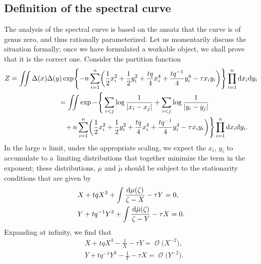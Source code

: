 \documentclass[pdftex]{sigma}
\DeclareMathOperator{\OO}{\mathcal{O}}
\numberwithin{equation}{section}
\begin{document}
\subsection{Definition of the spectral curve}
The analysis of the spectral curve is based on the ansatz that the curve is of genus zero, and thus rationally parameterized. Let us momentarily discuss the situation formally; once we have formulated a workable object, we shall prove that it is the correct one. Consider the partition function
 \begin{gather*}
 Z= \iint \Delta(x) \Delta(y) \exp\Biggl\{-n\sum_{i=1}^n \biggl(\frac{1}{2}x_i^2 + \frac{1}{2}y_i^2 + \frac{t q}{4} x_i^4 + \frac{t q^{-1}}{4} y_i^4 - \tau x_iy_i\biggr)\Biggr\} \prod_{i=1}^n {\rm d}x_i {\rm d}y_i\\
 \hphantom{Z}{}
= \iint \exp - \Bigg\{ \sum_{i < j} \log\frac{1}{|x_i - x_j|} + \sum_{i < j} \log\frac{1}{|y_i - y_j|} \\
\hphantom{Z=\iint \exp - \Bigg\{}{}
+ n\sum_{i=1}^n \biggl(\frac{1}{2}x_i^2 + \frac{1}{2}y_i^2 + \frac{t q}{4} x_i^4 + \frac{t q^{-1}}{4} y_i^4 - \tau x_iy_i\biggr)\Bigg\} \prod_{i=1}^n {\rm d}x_i {\rm d}y_i.
 \end{gather*}
In the large $n$ limit, under the appropriate scaling, we expect the $x_i$, $y_i$ to accumulate to a~limiting distributions that together minimize the term in the exponent; these distributions, $\mu$ and $\tilde \mu$ should be subject to the stationarity conditions that are given by
 \begin{align*}
 &X + t q X^3 + \int \frac{{\rm d}\mu(\zeta)}{\zeta - X} - \tau Y= 0,\\
 &Y + t q^{-1} Y^3 + \int \frac{{\rm d}\tilde{\mu}(\zeta)}{\zeta - Y} - \tau X= 0.
 \end{align*}
Expanding at infinity, we find that
 \begin{align}
 &X + t qX^3 - \frac{1}{X} - \tau Y= \OO\bigl(X^{-2}\bigr), \label{stationarity-X}\\
 &Y + t q^{-1} Y^3 - \frac{1}{Y} - \tau X= \OO\bigl(Y^{-2}\bigr).\label{stationarity-Y}
 \end{align}
\end{document}
